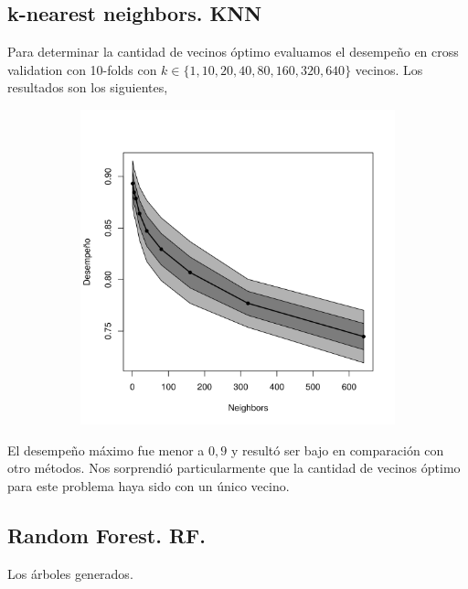 \documentclass[a4paper,10pt]{article}
\begin{document}
\subsection{k-nearest neighbors. KNN}

Para determinar la cantidad de vecinos \'optimo evaluamos el desempeño en cross validation con 10-folds con $k \in \{1,10,20,40,80,160,320,640\} $ vecinos. Los resultados son los siguientes, 

\begin{figure}[H]
  \centering
  \begin{subfigure}[b]{0.4\textwidth}
    \includegraphics[width=\textwidth]{../imagenes/knn-n_neighbors}
  \end{subfigure}
  \caption{}
  \label{fig:knn-n_neighbors}
\end{figure}

El desempeño m\'aximo fue menor a $0,9$ y result\'o ser bajo en comparaci\'on con otro m\'etodos. Nos sorprendi\'o particularmente que la cantidad de vecinos \'optimo para este problema haya sido con un \'unico vecino. 

\subsection{Random Forest. RF.}

Los \'arboles generados. 
\end{document}
